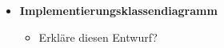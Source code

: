 
\begin{itemize}[label={},noitemsep,topsep=0pt,parsep=0pt,partopsep=0pt,leftmargin=*]
    \item \textbf{Implementierungsklassendiagramm}
    \begin{itemize}[label={},noitemsep,topsep=0pt,parsep=0pt,partopsep=0pt,leftmargin=*]
        \item Erkläre diesen Entwurf?
    \end{itemize}
\end{itemize}

